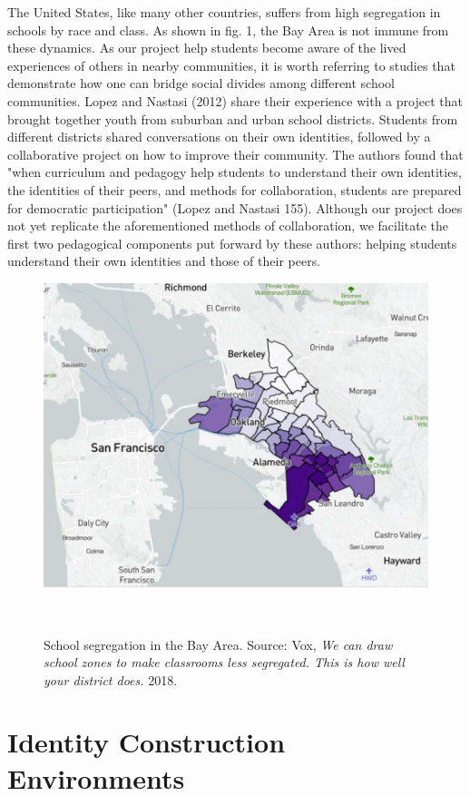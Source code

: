 \documentclass{sigchi-ext}
\begin{document}
The United States, like many other countries, suffers from high segregation in schools by race and class. As shown in fig. 1, the Bay Area is not immune from these dynamics. As our project help students become aware of the lived experiences of others in nearby communities, it is worth referring to studies that demonstrate how one can bridge social divides among different school communities. Lopez and Nastasi (2012) share their experience with a project that brought together youth from suburban and urban school districts. Students from different districts shared conversations on their own identities, followed by a collaborative project on how to improve their community. The authors found that "when curriculum and pedagogy help students to understand their own identities, the identities of their peers, and methods for collaboration, students are prepared for democratic participation" (Lopez and Nastasi 155). Although our project does not yet replicate the aforementioned methods of collaboration, we facilitate the first two pedagogical components put forward by these authors: helping students understand their own identities and those of their peers.

\begin{figure}
  \includegraphics[width=0.9\columnwidth]{figures/map}
  \caption{School segregation in the Bay Area. Source: Vox, \textit{We can draw school zones to make classrooms less segregated. This is how well your district does.} 2018.}~\label{fig:sample}
\end{figure}

\section{Identity Construction Environments}
\end{document}
